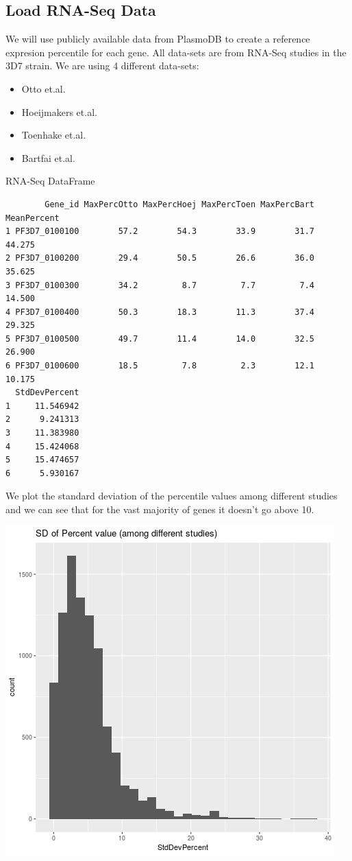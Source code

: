 \documentclass[11pt]{article}
\begin{document}
\subsection{Load RNA-Seq Data}
\label{sec:orgc0dc0bc}
We will use publicly available data from PlasmoDB to create a reference expresion percentile for each gene.
All data-sets are from RNA-Seq studies in the 3D7 strain.
We are using 4 different data-sets:
\begin{itemize}
\item Otto et.al.
\item Hoeijmakers et.al.
\item Toenhake et.al.
\item Bartfai et.al.
\end{itemize}

RNA-Seq DataFrame
\begin{verbatim}
        Gene_id MaxPercOtto MaxPercHoej MaxPercToen MaxPercBart MeanPercent
1 PF3D7_0100100        57.2        54.3        33.9        31.7      44.275
2 PF3D7_0100200        29.4        50.5        26.6        36.0      35.625
3 PF3D7_0100300        34.2         8.7         7.7         7.4      14.500
4 PF3D7_0100400        50.3        18.3        11.3        37.4      29.325
5 PF3D7_0100500        49.7        11.4        14.0        32.5      26.900
6 PF3D7_0100600        18.5         7.8         2.3        12.1      10.175
  StdDevPercent
1     11.546942
2      9.241313
3     11.383980
4     15.424068
5     15.474657
6      5.930167
\end{verbatim}

We plot the standard deviation of the percentile values among different studies and we can see that for the vast majority of genes it doesn't go above 10.
\begin{center}
\includegraphics[width=.9\linewidth]{./Plots/rnaseq_perc_sd.png}
\end{center}
\end{document}
